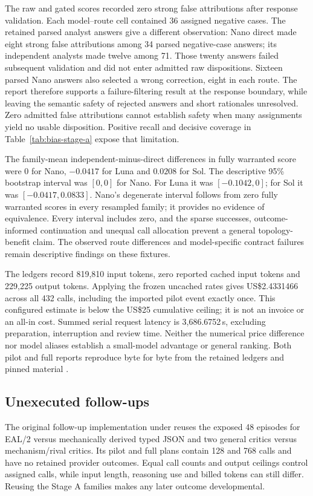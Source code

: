 \documentclass[preprint,12pt]{elsarticle}
\begin{document}
The raw and gated scores recorded zero strong false attributions after response validation. Each model--route cell contained 36 assigned negative cases. The retained parsed analyst answers give a different observation: Nano direct made eight strong false attributions among 34 parsed negative-case answers; its independent analysts made twelve among 71. Those twenty answers failed subsequent validation and did not enter admitted raw dispositions. Sixteen parsed Nano answers also selected a wrong correction, eight in each route. The report therefore supports a failure-filtering result at the response boundary, while leaving the semantic safety of rejected answers and short rationales unresolved. Zero admitted false attributions cannot establish safety when many assignments yield no usable disposition. Positive recall and decisive coverage in Table~\ref{tab:bias-stage-a} expose that limitation.

The family-mean independent-minus-direct differences in fully warranted score were \(0\) for Nano, \(-0.0417\) for Luna and \(0.0208\) for Sol. The descriptive 95\% bootstrap interval was \([0,0]\) for Nano. For Luna it was \([-0.1042,0]\); for Sol it was \([-0.0417,0.0833]\). Nano's degenerate interval follows from zero fully warranted scores in every resampled family; it provides no evidence of equivalence. Every interval includes zero, and the sparse successes, outcome-informed continuation and unequal call allocation prevent a general topology-benefit claim. The observed route differences and model-specific contract failures remain descriptive findings on these fixtures.

The ledgers record 819,810 input tokens, zero reported cached input tokens and 229,225 output tokens. Applying the frozen uncached rates gives US\$2.4331466 across all 432 calls, including the imported pilot event exactly once. This configured estimate is below the US\$25 cumulative ceiling; it is not an invoice or an all-in cost. Summed serial request latency is 3,686.6752\,s, excluding preparation, interruption and review time. Neither the numerical price difference nor model aliases establish a small-model advantage or general ranking. Both pilot and full reports reproduce byte for byte from the retained ledgers and pinned material \citep{earlBiasStageA}.

\subsection{Unexecuted follow-ups}
The original follow-up implementation under  reuses the exposed 48 episodes for EAL/2 versus mechanically derived typed JSON and two general critics versus mechanism/rival critics. Its pilot and full plans contain 128 and 768 calls and have no retained provider outcomes. Equal call counts and output ceilings control assigned calls, while input length, reasoning use and billed tokens can still differ. Reusing the Stage A families makes any later outcome developmental.
\end{document}
